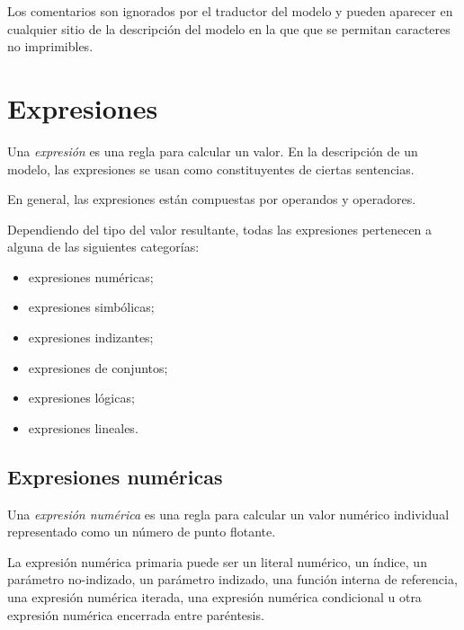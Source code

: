 \documentclass[11pt,spanish]{report}
\begin{document}
Los comentarios son ignorados por el traductor del modelo y pueden aparecer en cualquier sitio de la descripción del modelo en la que que se permitan caracteres no imprimibles.


\newpage

\chapter{Expresiones}

Una {\it expresión} es una regla para calcular un valor. En la descripción de un modelo, las expresiones se usan como constituyentes de ciertas sentencias.

En general, las expresiones están compuestas por operandos y operadores.

Dependiendo del tipo del valor resultante, todas las expresiones pertenecen a alguna de las siguientes categorías:

\vspace*{-8pt}

\begin{itemize}
\item expresiones numéricas;
\item expresiones simbólicas;
\item expresiones indizantes;
\item expresiones de conjuntos;
\item expresiones lógicas;
\item expresiones lineales.
\end{itemize}

\vspace*{-8pt}

\section{Expresiones numéricas}

Una {\it expresión numérica} es una regla para calcular un valor numérico individual representado como un número de punto flotante.

La expresión numérica primaria puede ser un literal numérico, un índice, un parámetro no-indizado, un parámetro indizado, una función interna de referencia, una expresión numérica iterada, una expresión numérica condicional u otra expresión numérica encerrada entre paréntesis.

\newpage
\end{document}
